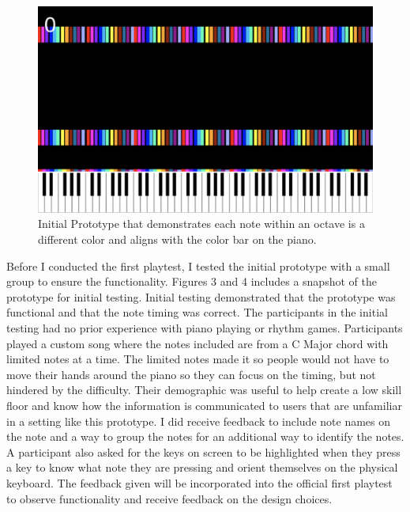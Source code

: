 \documentclass[10pt,twocolumn]{article}
\begin{document}
\begin{figure}
    \centering
    \includegraphics[width=.95\linewidth]{pulsekey-proto1-all notes.png}
    \caption{
       Initial Prototype that demonstrates each note within an octave is a different color and aligns with the color bar on the piano. 
    }
    \label{fig:first-page}
\end{figure}

Before I conducted the first playtest, I tested the initial prototype with a small group to ensure the functionality. Figures 3 and 4 includes a snapshot of the prototype for initial testing. Initial testing demonstrated that the prototype was functional and that the note timing was correct. The participants in the initial testing had no prior experience with piano playing or rhythm games. Participants played a custom song where the notes included are from a C Major chord with limited notes at a time. The limited notes made it so people would not have to move their hands around the piano so they can focus on the timing, but not hindered by the difficulty. Their demographic was useful to help create a low skill floor and know how the information is communicated to users that are unfamiliar in a setting like this prototype. I did receive feedback to include note names on the note and a way to group the notes for an additional way to identify the notes. A participant also asked for the keys on screen to be highlighted when they press a key to know what note they are pressing and orient themselves on the physical keyboard. The feedback given will be incorporated into the official first playtest to observe functionality and receive feedback on the design choices. 
\end{document}
